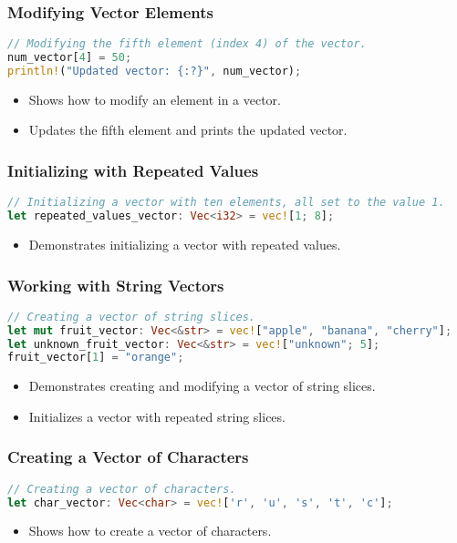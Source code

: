 \documentclass[aspectratio=169, table]{beamer}
\begin{document}
\begin{frame}[fragile]
\frametitle{Modifying Vector Elements}
\begin{lstlisting}[language=Rust]
// Modifying the fifth element (index 4) of the vector.
num_vector[4] = 50; 
println!("Updated vector: {:?}", num_vector);
\end{lstlisting}
\begin{itemize}
\item Shows how to modify an element in a vector.
\item Updates the fifth element and prints the updated vector.
\end{itemize}
\end{frame}

\begin{frame}[fragile]
\frametitle{Initializing with Repeated Values}
\begin{lstlisting}[language=Rust]
// Initializing a vector with ten elements, all set to the value 1.
let repeated_values_vector: Vec<i32> = vec![1; 8];
\end{lstlisting}
\begin{itemize}
\item Demonstrates initializing a vector with repeated values.
\end{itemize}
\end{frame}

\begin{frame}[fragile]
\frametitle{Working with String Vectors}
\begin{lstlisting}[language=Rust]
// Creating a vector of string slices.
let mut fruit_vector: Vec<&str> = vec!["apple", "banana", "cherry"];
let unknown_fruit_vector: Vec<&str> = vec!["unknown"; 5]; 
fruit_vector[1] = "orange"; 
\end{lstlisting}
\begin{itemize}
\item Demonstrates creating and modifying a vector of string slices.
\item Initializes a vector with repeated string slices.
\end{itemize}
\end{frame}

\begin{frame}[fragile]
\frametitle{Creating a Vector of Characters}
\begin{lstlisting}[language=Rust]
// Creating a vector of characters.
let char_vector: Vec<char> = vec!['r', 'u', 's', 't', 'c'];
\end{lstlisting}
\begin{itemize}
\item Shows how to create a vector of characters.
\end{itemize}
\end{frame}
\end{document}
